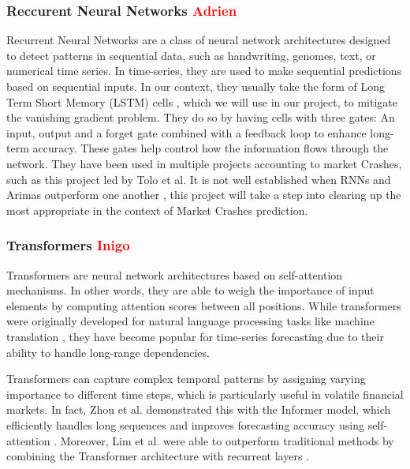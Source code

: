 \documentclass[12pt, letterpaper]{article}
\begin{document}
    \subsubsection*{Reccurent Neural Networks \textcolor{red}{Adrien}}
    Recurrent Neural Networks are a class of neural network architectures designed to detect patterns in sequential data, such as handwriting, genomes, text, or numerical time series. In time-series, they are used to make sequential predictions based on sequential inputs. \cite{Schmidt} In our context, they usually take the form of Long Term Short Memory (LSTM) cells \cite{Hansika}, which we will use in our project, to mitigate the vanishing gradient problem. They do so by having cells with three gates: An input, output and a forget gate combined with a feedback loop to enhance long-term accuracy. These gates help control how the information flows through the network. \cite{Hansika} They have been used in multiple projects accounting to market Crashes, such as this project led by Tolo et al. \cite{Tolo} It is not well established when RNNs and Arimas outperform one another \cite{Hansika}, this project will take a step into clearing up the most appropriate in the context of Market Crashes prediction.

    \subsubsection*{Transformers \textcolor{red}{Inigo}}
Transformers are neural network architectures based on self-attention mechanisms. In other words, they are able to weigh the importance of input elements by computing attention scores between all positions. While transformers were originally developed for natural language processing tasks like machine translation \cite{vaswani2017attention}, they have become popular for time-series forecasting due to their ability to handle long-range dependencies.

Transformers can capture complex temporal patterns by assigning varying importance to different time steps, which is particularly useful in volatile financial markets. In fact, Zhou et al. demonstrated this with the Informer model, which efficiently handles long sequences and improves forecasting accuracy using self-attention \cite{zhou2021informer}. Moreover, Lim et al. were able to outperform traditional methods by combining the Transformer architecture with recurrent layers \cite{lim2021temporal}.
\end{document}

